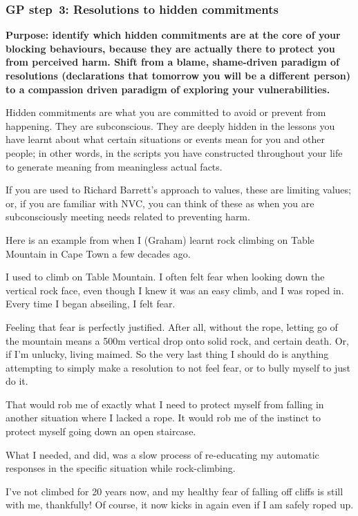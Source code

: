\subsubsection[GP step~3: Resolutions to hidden commitments]{GP step~3: Resolutions to hidden commitments}


\textbf{Purpose: identify which hidden commitments are at the core of your blocking behaviours, because they are actually there to protect you from perceived harm. Shift from a blame, shame-driven paradigm of resolutions (declarations that tomorrow you will be a different person) to a compassion driven paradigm of exploring your vulnerabilities.} ~


Hidden commitments are what you are committed to avoid or prevent from happening. They are subconscious. They are deeply hidden in the lessons you have learnt about what certain situations or events mean for you and other people; in other words, in the scripts you have constructed throughout your life to generate meaning from meaningless actual facts. 


If you are used to Richard Barrett's approach to values\cite{barrett-values}, these are limiting values; or, if you are familiar with NVC, you can think of these as when you are subconsciously meeting needs related to preventing harm.


Here is an example from when I (Graham) learnt rock climbing on Table Mountain in Cape Town a few decades ago.
\begin{longstoryblock}
I used to climb on Table Mountain. I often felt fear when looking down the vertical rock face, even though I knew it was an easy climb, and I was roped in. Every time I began abseiling, I felt fear. 


Feeling that fear is perfectly justified. After all, without the rope, letting go of the mountain means a 500m vertical drop onto solid rock, and certain death. Or, if I'm unlucky, living maimed. So the very last thing I should do is anything attempting to simply make a resolution to not feel fear, or to bully myself to just do it. 


That would rob me of exactly what I need to protect myself from falling in another situation where I lacked a rope. It would rob me of the instinct to protect myself  going down an open staircase.


What I needed, and did, was a slow process of re-educating my automatic responses in the specific situation while rock-climbing.


I've not climbed for 20 years now, and my healthy fear of falling off cliffs is still with me, thankfully! Of course, it now kicks in again even if I am safely roped up. 
\end{longstoryblock}


